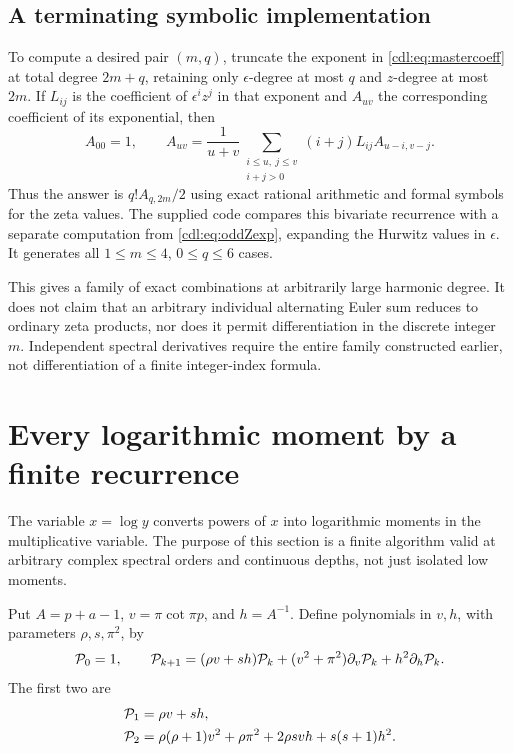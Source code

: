 \documentclass[11pt,letterpaper]{article}
\numberwithin{equation}{section}
\theoremstyle{definition}\newtheorem{definition}[theorem]{Definition}
\theoremstyle{remark}\newtheorem{remark}[theorem]{Remark}
\begin{document}
\subsection{A terminating symbolic implementation}
To compute a desired pair $(m,q)$, truncate the exponent in
\eqref{cdl:eq:mastercoeff} at total degree $2m+q$, retaining only
$\epsilon$-degree at most $q$ and $z$-degree at most $2m$.
If $L_{ij}$ is the coefficient of $\epsilon^iz^j$ in that exponent
and $A_{uv}$ the corresponding coefficient of its exponential, then
\begin{equation}\label{cdl:eq:coeffrecurrence}
 A_{00}=1,\qquad
 A_{uv}=\frac1{u+v}\sum_{\substack{i\le u,\ j\le v\\i+j>0}}
 (i+j)L_{ij}A_{u-i,v-j}.
\end{equation}
Thus the answer is $q!A_{q,2m}/2$ using exact rational arithmetic
and formal symbols for the zeta values. The supplied code compares
this bivariate recurrence with a separate computation from
\eqref{cdl:eq:oddZexp}, expanding the Hurwitz values in $\epsilon$.
It generates all $1\le m\le4$, $0\le q\le6$ cases.

This gives a family of exact combinations at arbitrarily large harmonic
degree. It does not claim that an arbitrary individual alternating Euler
sum reduces to ordinary zeta products, nor does it permit differentiation
in the discrete integer $m$. Independent spectral derivatives require
the entire family constructed earlier, not differentiation of a finite
integer-index formula.

\section{Every logarithmic moment by a finite recurrence}
\label{cdl:sec:moments}

The variable $x=\log y$ converts powers of $x$ into logarithmic moments
in the multiplicative variable. The purpose of this section is a finite
algorithm valid at arbitrary complex spectral orders and continuous
depths, not just isolated low moments.

Put $A=p+a-1$, $v=\pi\cot\pi p$, and $h=A^{-1}$.
Define polynomials in $v,h$, with parameters $\rho,s,\pi^2$, by
\begin{equation}\label{cdl:eq:momentrec}
 \mathcal P_0=1,\qquad
 \mathcal P_{k+1}=(\rho v+sh)\mathcal P_k+
 (v^2+\pi^2)\partial_v\mathcal P_k+h^2\partial_h\mathcal P_k.
\end{equation}
The first two are
\begin{align}
 \mathcal P_1&=\rho v+sh,\label{cdl:eq:P1}\\
 \mathcal P_2&=\rho(\rho+1)v^2+\rho\pi^2+
            2\rho s vh+s(s+1)h^2.\label{cdl:eq:P2}
\end{align}
\end{document}
